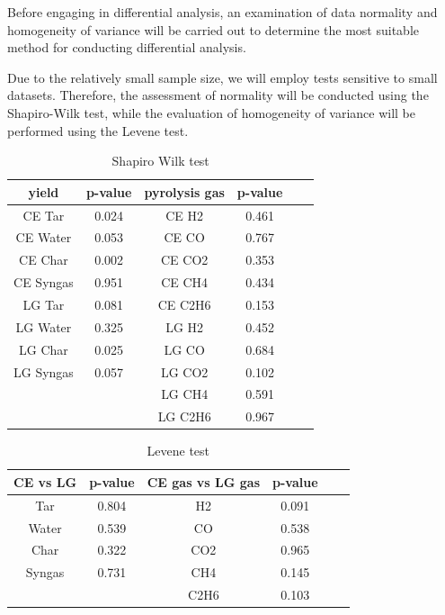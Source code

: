 \documentclass{swmcmthesis}
\begin{document}
Before engaging in differential analysis, an examination of data normality and homogeneity of variance will be carried out to determine the most suitable method for conducting differential analysis.

Due to the relatively small sample size, we will employ tests sensitive to small datasets. Therefore, the assessment of normality will be conducted using the Shapiro-Wilk test, while the evaluation of homogeneity of variance will be performed using the Levene test.

\begin{table}[h!t]
    \centering
    \caption{Shapiro Wilk test}
    \label{tbl:label}
    \begin{tabular}{cccccc}
    \toprule
    yield & p-value & pyrolysis gas & p-value \\
    \midrule
    CE Tar & 0.024 & CE H2 & 0.461 \\
    CE Water & 0.053 & CE CO & 0.767 \\
    CE Char & 0.002 & CE CO2 & 0.353 \\
    CE Syngas & 0.951 & CE CH4 & 0.434  \\
    LG Tar & 0.081 & CE C2H6 & 0.153 \\
    LG Water & 0.325 & LG H2 & 0.452 \\
    LG Char & 0.025 & LG CO & 0.684 \\
    LG Syngas & 0.057 & LG CO2 & 0.102 \\
    & & LG CH4 & 0.591 \\
    & & LG C2H6 & 0.967 \\
    \bottomrule
    \end{tabular}
\end{table}

\newpage

\begin{table}[h!t]
    \centering
    \caption{Levene test}
    \label{tbl:label}
    \begin{tabular}{cccccc}
    \toprule
    CE vs LG & p-value & CE gas vs LG gas & p-value \\
    \midrule
    Tar & 0.804 & H2 & 0.091 \\
    Water & 0.539 & CO & 0.538 \\
    Char & 0.322 & CO2 & 0.965 \\
    Syngas & 0.731 & CH4 & 0.145  \\
    &  & C2H6 & 0.103 \\

    \bottomrule
    \end{tabular}
\end{table}
\end{document}
